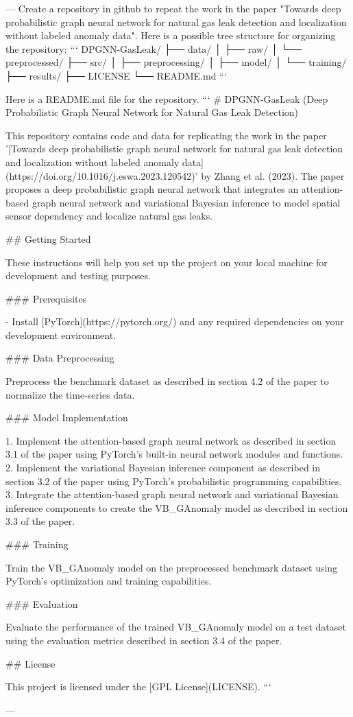 ---
Create a repository in github to repeat the work in the paper "Towards deep probabilistic graph neural network for natural gas leak detection and localization without labeled anomaly data".
Here is a possible tree structure for organizing the repository:
```
DPGNN-GasLeak/
├── data/
│   ├── raw/
│   └── preprocessed/
├── src/
│   ├── preprocessing/
│   ├── model/
│   └── training/
├── results/
├── LICENSE
└── README.md
```

Here is a README.md file for the repository.
```
# DPGNN-GasLeak (Deep Probabilistic Graph Neural Network for Natural Gas Leak Detection)

This repository contains code and data for replicating the work in the paper '[Towards deep probabilistic graph neural network for natural gas leak detection and localization without labeled anomaly data](https://doi.org/10.1016/j.eswa.2023.120542)' by Zhang et al. (2023). The paper proposes a deep probabilistic graph neural network that integrates an attention-based graph neural network and variational Bayesian inference to model spatial sensor dependency and localize natural gas leaks.

## Getting Started

These instructions will help you set up the project on your local machine for development and testing purposes.

### Prerequisites

- Install [PyTorch](https://pytorch.org/) and any required dependencies on your development environment.

### Data Preprocessing

Preprocess the benchmark dataset as described in section 4.2 of the paper to normalize the time-series data.

### Model Implementation

1. Implement the attention-based graph neural network as described in section 3.1 of the paper using PyTorch’s built-in neural network modules and functions.
2. Implement the variational Bayesian inference component as described in section 3.2 of the paper using PyTorch’s probabilistic programming capabilities.
3. Integrate the attention-based graph neural network and variational Bayesian inference components to create the VB_GAnomaly model as described in section 3.3 of the paper.

### Training

Train the VB_GAnomaly model on the preprocessed benchmark dataset using PyTorch’s optimization and training capabilities.

### Evaluation

Evaluate the performance of the trained VB_GAnomaly model on a test dataset using the evaluation metrics described in section 3.4 of the paper.

## License

This project is licensed under the [GPL License](LICENSE).
```

---




